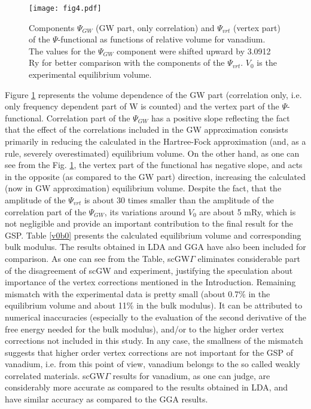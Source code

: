 \documentclass[aps,prb,floatfix,epsfig,twocolumn,preprintnumbers]{revtex4}
\begin{document}
\begin{figure}[t]
\centering
\texttt{[image: fig4.pdf]}
\caption{Components $\Psi_{GW}$ (GW part, only correlation) and $\Psi_{vrt}$ (vertex part) of the $\Psi$-functional as functions of relative volume for vanadium. The values for the $\Psi_{GW}$ component were shifted upward by 3.0912 Ry for better comparison with the components of the $\Psi_{vrt}$. $V_{0}$ is the experimental equilibrium volume.} \label{psi_vv0}
\end{figure}

Figure \ref{psi_vv0} represents the volume dependence of the GW part (correlation only, i.e. only frequency dependent part of W is counted) and the vertex part of the $\Psi$-functional. Correlation part of the $\Psi_{GW}$ has a positive slope reflecting the fact that the effect of the correlations included in the GW approximation consists primarily in reducing the calculated in the Hartree-Fock approximation (and, as a rule, severely overestimated) equilibrium volume. On the other hand, as one can see from the Fig. \ref{psi_vv0}, the vertex part of the functional has negative slope, and acts in the opposite (as compared to the GW part) direction, increasing the calculated (now in GW approximation) equilibrium volume. Despite the fact, that the amplitude of the $\Psi_{vrt}$ is about 30 times smaller than the amplitude of the correlation part of the $\Psi_{GW}$, its variations around $V_{0}$ are about 5 mRy, which is not negligible and provide an important contribution to the final result for the GSP. Table \ref{v0b0} presents the calculated equilibrium volume and corresponding bulk modulus. The results obtained in LDA and GGA have also been included for comparison. As one can see from the Table, scGW$\Gamma$ eliminates considerable part of the disagreement of scGW and experiment, justifying the speculation about importance of the vertex corrections mentioned in the Introduction. Remaining mismatch with the experimental data is pretty small (about 0.7\% in the equilibrium volume and about 11\% in the bulk modulus). It can be attributed to numerical inaccuracies (especially to the evaluation of the second derivative of the free energy needed for the bulk modulus), and/or to the higher order vertex corrections not included in this study. In any case, the smallness of the mismatch suggests that higher order vertex corrections are not important for the GSP of vanadium, i.e. from this point of view, vanadium belongs to the so called weakly correlated materials. scGW$\Gamma$ results for vanadium, as one can judge, are considerably more accurate as compared to the results obtained in LDA, and have similar accuracy as compared to the GGA results.
\end{document}
